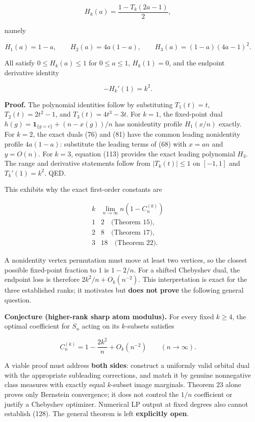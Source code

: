 \documentclass[
  11pt,
]{article}
\begin{document}
\[
\boxed{H_k(a)=\frac{1-T_k(2a-1)}2,}
\]

namely

\[
H_1(a)=1-a,\qquad
H_2(a)=4a(1-a),\qquad
H_3(a)=(1-a)(4a-1)^2.
\tag{125}
\]

All satisfy \(0\le H_k(a)\le1\) for \(0\le a\le1\), \(H_k(1)=0\), and
the endpoint derivative identity

\[
-H_k'(1)=k^2. \tag{126}
\]

\textbf{Proof.} The polynomial identities follow by substituting
\(T_1(t)=t\), \(T_2(t)=2t^2-1\), and \(T_3(t)=4t^3-3t\). For \(k=1\),
the fixed-point dual \(h(g)=\mathbf1_{\{g=e\}}+(n-x(g))/n\) has
nonidentity profile \(H_1(x/n)\) exactly. For \(k=2\), the exact duals
(76) and (81) have the common leading nonidentity profile \(4a(1-a)\):
substitute the leading terms of (68) with \(x=an\) and \(y=O(n)\). For
\(k=3\), equation (113) provides the exact leading polynomial \(H_3\).
The range and derivative statements follow from \(|T_k(t)|\le1\) on
\([-1,1]\) and \(T_k'(1)=k^2\). QED.

This exhibits why the exact first-order constants are

\[
\begin{array}{c|c}
k & \displaystyle\lim_{n\to\infty}n(1-C_n^{(k)})\\ \hline
1&2\quad\text{(Theorem 15)},\\
2&8\quad\text{(Theorem 17)},\\
3&18\quad\text{(Theorem 22)}.
\end{array}
\tag{127}
\]

A nonidentity vertex permutation must move at least two vertices, so the
closest possible fixed-point fraction to \(1\) is \(1-2/n\). For a
shifted Chebyshev dual, the endpoint loss is therefore
\(2k^2/n+O_k(n^{-2})\). This interpretation is exact for the three
established ranks; it motivates but \textbf{does not prove} the
following general question.

\textbf{Conjecture (higher-rank sharp atom modulus).} For every fixed
\(k\ge4\), the optimal coefficient for \(S_n\) acting on its
\(k\)-subsets satisfies

\[
C_n^{(k)}=1-\frac{2k^2}{n}+O_k(n^{-2})
\qquad(n\to\infty). \tag{128}
\]

A viable proof must address \textbf{both sides}: construct a uniformly
valid orbital dual with the appropriate subleading corrections, and
match it by genuine nonnegative class measures with exactly equal
\(k\)-subset image marginals. Theorem 23 alone proves only Bernstein
convergence; it does not control the \(1/n\) coefficient or justify a
Chebyshev optimizer. Numerical LP output at fixed degrees also cannot
establish (128). The general theorem is left \textbf{explicitly open}.
\end{document}
